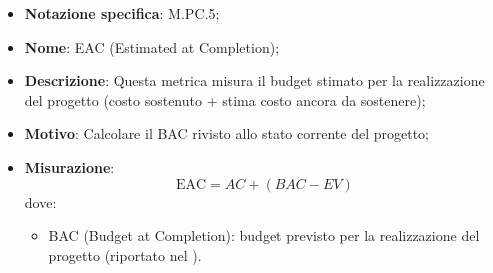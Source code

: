 \begin{itemize}
    \item \textbf{Notazione specifica}: M.PC.5;
    \item \textbf{Nome}: EAC (Estimated at Completion);
    \item \textbf{Descrizione}: Questa metrica misura il budget stimato per la realizzazione del progetto (costo sostenuto + stima costo ancora da sostenere);
    \item \textbf{Motivo}: Calcolare il BAC rivisto allo stato corrente del progetto;
    \item \textbf{Misurazione}:
    \[
        \text{EAC} = \textit{AC} + (\textit{BAC} - \textit{EV})
    \]
    dove:
    \begin{itemize}
        \item BAC (Budget at Completion): budget previsto per la realizzazione del progetto (riportato nel \PianoDiProgetto).
    \end{itemize}
\end{itemize}
